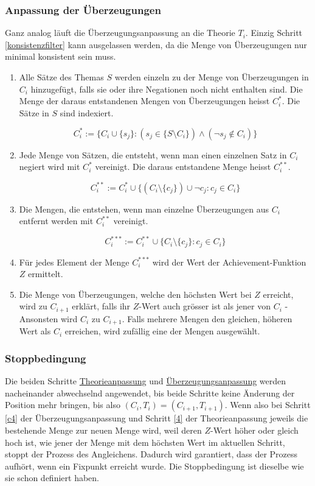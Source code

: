 \documentclass{article}
\begin{document}
\subsubsection{Anpassung der Überzeugungen} \label{C-Anpassung}
Ganz analog läuft die Überzeugungsanpassung an die Theorie $T_i$. Einzig Schritt \ref{konsistenzfilter} kann ausgelassen werden, da die Menge von Überzeugungen nur minimal konsistent sein muss.
\begin{enumerate}
    \item \label{c1} Alle Sätze des Themas $S$ werden einzeln zu der Menge von Überzeugungen in $C_i$ hinzugefügt, falls sie oder ihre Negationen noch nicht enthalten sind. Die Menge der daraus entstandenen Mengen von Überzeugungen heisst $C_i^*$. Die Sätze in $S$ sind indexiert.
    
    $$ 
    C_i^*:= \{ C_i \cup \{s_j\}: (s_j \in \{ S \setminus C_i \}) \land (\neg s_j \not\in C_i) \}
    $$
    
    \item \label{c1.1} Jede Menge von Sätzen, die entsteht, wenn man einen einzelnen Satz in $C_i$ negiert wird mit $C_i^*$ vereinigt. Die daraus entstandene Menge heisst $C_i^{**}$.
    
    $$
    C_i^{**}:= C_i^* \cup \{ (C_i \setminus \{c_j\}) \cup \neg c_j: c_j \in C_i\}
    $$
    
    \item \label{c2} Die Mengen, die entstehen, wenn man einzelne Überzeugungen aus $C_i$ entfernt werden mit $C_i^{**}$ vereinigt.
    
    $$
    C_i^{***}:= C_i^{**} \cup \{ C_i \setminus \{c_j\}: c_j \in C_i\}
    $$
    
    \item \label{c3} Für jedes Element der Menge $C_i^{***}$ wird der Wert der Achievement-Funktion $Z$ ermittelt.
    \item \label{c4}Die Menge von Überzeugungen, welche den höchsten Wert bei $Z$ erreicht, wird zu $C_{i+1}$ erklärt, falls ihr $Z$-Wert auch grösser ist als jener von $C_i$ - Ansonsten wird $C_i$ zu $C_{i+1}$. Falls mehrere Mengen den gleichen, höheren Wert als $C_i$ erreichen, wird zufällig eine der Mengen ausgewählt.\footnotemark[\value{footnote}]
\end{enumerate}

\subsubsection{Stoppbedingung}
Die beiden Schritte \hyperref[T-Anpassung]{Theorieanpassung} und \hyperref[C-Anpassung]{Überzeugungsanpassung} werden nacheinander abwechselnd angewendet, bis beide Schritte keine Änderung der Position mehr bringen, bis also $(C_i, T_i) = (C_{i+1}, T_{i+1})$. Wenn also bei Schritt \ref{c4} der Überzeugungsanpassung und Schritt \ref{4} der Theorieanpassung jeweils die bestehende Menge zur neuen Menge wird, weil deren $Z$-Wert höher oder gleich hoch ist, wie jener der Menge mit dem höchsten Wert im aktuellen Schritt, stoppt der Prozess des Angleichens. Dadurch wird garantiert, dass der Prozess aufhört, wenn ein Fixpunkt erreicht wurde. Die Stoppbedingung ist dieselbe wie \autocite[S. 450]{beisbart_making_2021} sie schon definiert haben.
\end{document}
